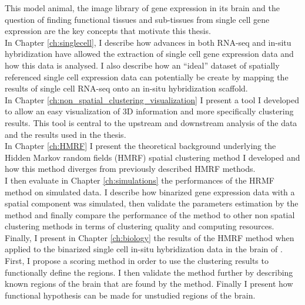 	This model animal, the image library of gene expression in its brain and the question of finding functional tissues and sub-tissues from single cell gene expression are the key concepts that motivate this thesis.\\
	
	In Chapter \ref{ch:singlecell}, I describe how advances in both RNA-seq and in-situ hybridization have allowed the extraction of single cell gene expression data and how this data is analysed. I also describe how an ``ideal'' dataset of spatially referenced single cell expression data can potentially be create by mapping the results of single cell RNA-seq onto an in-situ hybridization scaffold.\\
	
	In Chapter \ref{ch:non_spatial_clustering_visualization} I present a tool I developed to allow an easy visualization of 3D information and more specifically clustering results. This tool is central to the upstream and downstream analysis of the data and the results used in the thesis.\\
	
	In Chapter \ref{ch:HMRF} I  present the theoretical background underlying the Hidden Markov random fields (HMRF) spatial clustering method I developed and how this method diverges from previously described HMRF methods. \\
	
	I then evaluate in Chapter \ref{ch:simulations} the performances of the HRMF method on simulated data. I describe how binarized gene expression data with a spatial component was simulated, then validate the parameters estimation by the method and finally compare the performance of the method to other non spatial clustering methods in terms of clustering quality and computing resources.\\
	
	Finally, I present in Chapter \ref{ch:biology} the results of the HMRF method when applied to the binarized single cell in-situ hybridization data in the brain of \platyfull{}. First, I propose a scoring method in order to use the clustering results to functionally define the regions. I then validate the method further by describing known regions of the brain that are found by the method. Finally I present how functional hypothesis can be made for unstudied regions of the brain.
	
	
	

%
%
%
%
%



